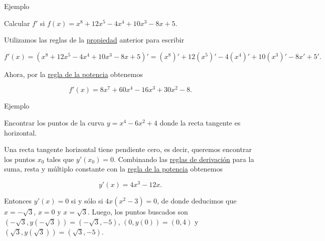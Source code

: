 \documentclass[
  letterpaper,
]{book}
\theoremstyle{plain}
\theoremstyle{remark}
\begin{document}
Ejemplo

Calcular \(f'\) si \(f(x)=x^8+12x^5-4x^4+10x^3-8x+5\).

\begin{tcolorbox}[enhanced jigsaw, opacityback=0, left=2mm, opacitybacktitle=0.6, toprule=.15mm, bottomrule=.15mm, colbacktitle=quarto-callout-tip-color!10!white, titlerule=0mm, bottomtitle=1mm, title=\textcolor{quarto-callout-tip-color}{\faLightbulb}\hspace{0.5em}{Solución}, toptitle=1mm, colframe=quarto-callout-tip-color-frame, colback=white, breakable, rightrule=.15mm, arc=.35mm, leftrule=.75mm, coltitle=black]

Utilizamos las reglas de la
\hyperref[teo-propiedades-derivada]{propiedad} anterior para escribir

\[
f'(x)=(x^8+12x^5-4x^4+10x^3-8x+5)'=\left(x^8\right)'+12\left(x^5\right)'-4\left(x^4\right)'+10\left(x^3\right)'-8x'+5'.
\]

Ahora, por la \hyperref[eq-regla-potencia]{regla de la potencia}
obtenemos

\[
f'(x)=8x^7+60x^4-16x^3+30x^2-8.
\]

\end{tcolorbox}

Ejemplo

Encontrar los puntos de la curva \(y=x^4-6x^2+4\) donde la recta
tangente es horizontal.

\begin{tcolorbox}[enhanced jigsaw, opacityback=0, left=2mm, opacitybacktitle=0.6, toprule=.15mm, bottomrule=.15mm, colbacktitle=quarto-callout-tip-color!10!white, titlerule=0mm, bottomtitle=1mm, title=\textcolor{quarto-callout-tip-color}{\faLightbulb}\hspace{0.5em}{Solución}, toptitle=1mm, colframe=quarto-callout-tip-color-frame, colback=white, breakable, rightrule=.15mm, arc=.35mm, leftrule=.75mm, coltitle=black]

Una recta tangente horizontal tiene pendiente cero, es decir, queremos
encontrar los puntos \(x_0\) tales que \(y'(x_0)=0\). Combinando las
\hyperref[teo-propiedades-derivada]{reglas de derivación} para la suma,
resta y múltiplo constante con la \hyperref[eq-regla-potencia]{regla de
la potencia} obtenemos

\[
y'(x)=4x^3-12x.
\]

Entonces \(y'(x)=0\) si y sólo si \(4x(x^2-3)=0\), de donde deducimos
que \(x=-\sqrt{3}\), \(x=0\) y \(x=\sqrt{3}\). Luego, los puntos
buscados son \((-\sqrt{3},y(-\sqrt{3}))=(-\sqrt{3},-5)\),
\((0,y(0))=(0,4)\) y \((\sqrt{3},y(\sqrt{3}))=(\sqrt{3},-5)\).

\end{tcolorbox}
\end{document}
